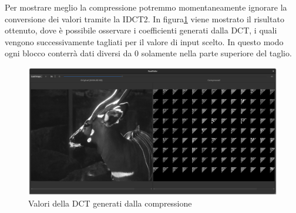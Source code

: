 Per mostrare meglio la compressione potremmo momentaneamente ignorare la conversione dei valori tramite la IDCT2. In figura\ref{fig:compression_values} viene mostrato il risultato ottenuto, dove è possibile osservare i coefficienti generati dalla DCT, i quali vengono successivamente tagliati per il valore di input scelto. In questo modo ogni blocco conterrà dati diversi da 0 solamente nella parte superiore del taglio.

\begin{figure}[h]
	\centering
	\includegraphics[width=1\linewidth]{figures/qt_dct_values}
	\caption{Valori della DCT generati dalla compressione}
	\label{fig:compression_values}
\end{figure}
